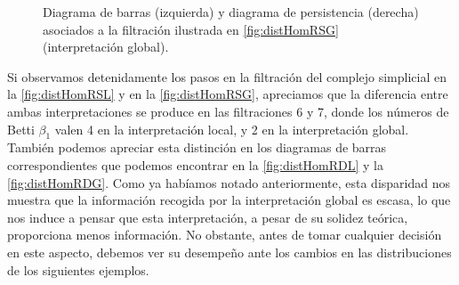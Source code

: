 \documentclass[12pt, a4paper, twoside]{book}
\numberwithin{equation}{section}
\theoremstyle{definition}
\newenvironment{ejem}
  {\pushQED{\qed}\renewcommand{\qedsymbol}{$\blacktriangleleft$}\ejemplo}
  {\popQED\endejemplo}
\theoremstyle{remark}
\theoremstyle{plain}
\begin{document}
\begin{ejem}
\begin{figure}[!htbp]
\begin{figure}[H]
			\end{figure}
		\endminipage
			\begin{figure}[H]
			\end{figure}
		\endminipage
		\caption{Diagrama de barras (izquierda) y diagrama de 
		persistencia (derecha) asociados a la filtración ilustrada en 
		\ref{fig:distHomRSG} (interpretación global).}
		\label{fig:distHomRDG}
	\end{figure}

	Si observamos detenidamente los pasos en la filtración del complejo 
	simplicial en la \autoref{fig:distHomRSL} y en la 
	\autoref{fig:distHomRSG}, 
	apreciamos que la diferencia entre ambas interpretaciones se produce 
	en las filtraciones 6 y 7, donde los números de Betti $\beta_{1}$ 
	valen 4 en la interpretación local, y 2 en la interpretación global. 
	También podemos apreciar esta distinción en los diagramas de barras 
	correspondientes que podemos encontrar en la 
	\autoref{fig:distHomRDL} y 
	la \autoref{fig:distHomRDG}. Como ya habíamos notado anteriormente, 
	esta 
	disparidad nos muestra que la información recogida por la 
	interpretación global es escasa, lo que nos induce a pensar que esta 
	interpretación, a pesar de su solidez teórica, proporciona menos 
	información. No 
	obstante, antes de tomar cualquier decisión en este aspecto, debemos 
	ver su desempeño ante los cambios en las distribuciones de los 
	siguientes ejemplos. 
	\end{ejem}
	
\end{document}

